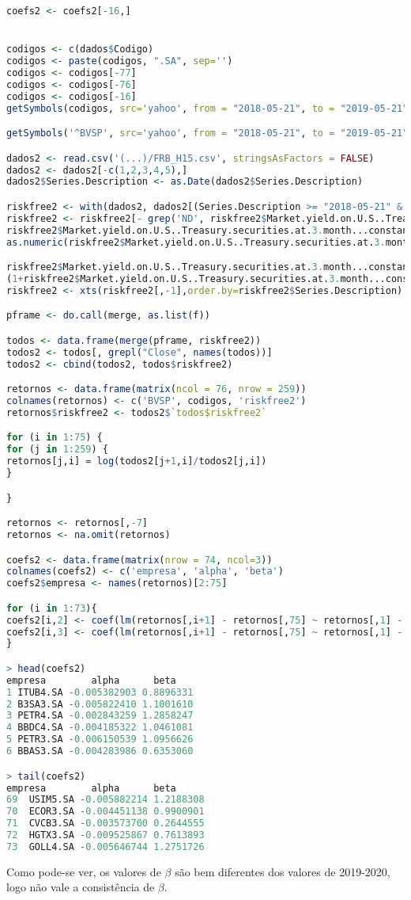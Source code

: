 \documentclass[12pt]{article}
\begin{document}
\begin{lstlisting}[language=R]
coefs2 <- coefs2[-16,]


codigos <- c(dados$Codigo)
codigos <- paste(codigos, ".SA", sep='')
codigos <- codigos[-77]
codigos <- codigos[-76]
codigos <- codigos[-16]
getSymbols(codigos, src='yahoo', from = "2018-05-21", to = "2019-05-21", env = f)

getSymbols('^BVSP', src='yahoo', from = "2018-05-21", to = "2019-05-21", env = f)

dados2 <- read.csv('(...)/FRB_H15.csv', stringsAsFactors = FALSE)
dados2 <- dados2[-c(1,2,3,4,5),]
dados2$Series.Description <- as.Date(dados2$Series.Description)

riskfree2 <- with(dados2, dados2[(Series.Description >= "2018-05-21" & Series.Description <= "2019-05-21"), c(1,3)]) 
riskfree2 <- riskfree2[- grep('ND', riskfree2$Market.yield.on.U.S..Treasury.securities.at.3.month...constant.maturity..quoted.on.investment.basis), ]
riskfree2$Market.yield.on.U.S..Treasury.securities.at.3.month...constant.maturity..quoted.on.investment.basis <- 
as.numeric(riskfree2$Market.yield.on.U.S..Treasury.securities.at.3.month...constant.maturity..quoted.on.investment.basis)

riskfree2$Market.yield.on.U.S..Treasury.securities.at.3.month...constant.maturity..quoted.on.investment.basis <- 
(1+riskfree2$Market.yield.on.U.S..Treasury.securities.at.3.month...constant.maturity..quoted.on.investment.basis)^(1/252)-1
riskfree2 <- xts(riskfree2[,-1],order.by=riskfree2$Series.Description)

pframe <- do.call(merge, as.list(f))

todos <- data.frame(merge(pframe, riskfree2))
todos2 <- todos[, grepl("Close", names(todos))]
todos2 <- cbind(todos2, todos$riskfree2)

retornos <- data.frame(matrix(ncol = 76, nrow = 259))
colnames(retornos) <- c('BVSP', codigos, 'riskfree2')
retornos$riskfree2 <- todos2$`todos$riskfree2`

for (i in 1:75) {
for (j in 1:259) {
retornos[j,i] = log(todos2[j+1,i]/todos2[j,i])
}

}

retornos <- retornos[,-7]
retornos <- na.omit(retornos)

coefs2 <- data.frame(matrix(nrow = 74, ncol=3))
colnames(coefs2) <- c('empresa', 'alpha', 'beta')
coefs2$empresa <- names(retornos)[2:75]

for (i in 1:73){
coefs2[i,2] <- coef(lm(retornos[,i+1] - retornos[,75] ~ retornos[,1] - retornos[,75]))['(Intercept)']
coefs2[i,3] <- coef(lm(retornos[,i+1] - retornos[,75] ~ retornos[,1] - retornos[,75]))['retornos[, 1]']
}

> head(coefs2)
empresa        alpha      beta
1 ITUB4.SA -0.005382903 0.8896331
2 B3SA3.SA -0.005822410 1.1001610
3 PETR4.SA -0.002843259 1.2858247
4 BBDC4.SA -0.004185322 1.0461081
5 PETR3.SA -0.006150539 1.0956626
6 BBAS3.SA -0.004283986 0.6353060

> tail(coefs2)
empresa        alpha      beta
69  USIM5.SA -0.005882214 1.2188308
70  ECOR3.SA -0.004451138 0.9900901
71  CVCB3.SA -0.003573700 0.2644555
72  HGTX3.SA -0.009525867 0.7613893
73  GOLL4.SA -0.005646744 1.2751726
\end{lstlisting} 

Como pode-se ver, os valores de $\beta$ são bem diferentes dos valores de 2019-2020, logo não vale a consistência de $\beta$.
\end{document}
